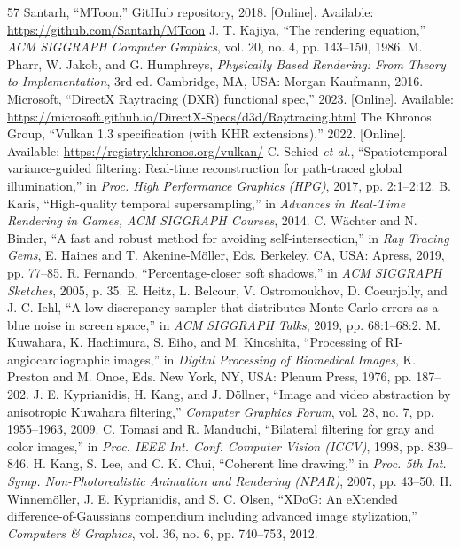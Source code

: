 \documentclass[conference]{IEEEtran}
\begin{document}
\begin{thebibliography}{57}
 Santarh, ``MToon,'' GitHub repository, 2018. [Online]. Available: \url{https://github.com/Santarh/MToon}
 J. T. Kajiya, ``The rendering equation,'' \textit{ACM SIGGRAPH Computer Graphics}, vol. 20, no. 4, pp. 143--150, 1986.
 M. Pharr, W. Jakob, and G. Humphreys, \textit{Physically Based Rendering: From Theory to Implementation}, 3rd ed. Cambridge, MA, USA: Morgan Kaufmann, 2016.
 Microsoft, ``DirectX Raytracing (DXR) functional spec,'' 2023. [Online]. Available: \url{https://microsoft.github.io/DirectX-Specs/d3d/Raytracing.html}
 The Khronos Group, ``Vulkan 1.3 specification (with KHR extensions),'' 2022. [Online]. Available: \url{https://registry.khronos.org/vulkan/}
 C. Schied \textit{et al.}, ``Spatiotemporal variance-guided filtering: Real-time reconstruction for path-traced global illumination,'' in \textit{Proc. High Performance Graphics (HPG)}, 2017, pp. 2:1--2:12.
 B. Karis, ``High-quality temporal supersampling,'' in \textit{Advances in Real-Time Rendering in Games, ACM SIGGRAPH Courses}, 2014.
 C. Wächter and N. Binder, ``A fast and robust method for avoiding self-intersection,'' in \textit{Ray Tracing Gems}, E. Haines and T. Akenine-Möller, Eds. Berkeley, CA, USA: Apress, 2019, pp. 77--85.
 R. Fernando, ``Percentage-closer soft shadows,'' in \textit{ACM SIGGRAPH Sketches}, 2005, p. 35.
 E. Heitz, L. Belcour, V. Ostromoukhov, D. Coeurjolly, and J.-C. Iehl, ``A low-discrepancy sampler that distributes Monte Carlo errors as a blue noise in screen space,'' in \textit{ACM SIGGRAPH Talks}, 2019, pp. 68:1--68:2.
 M. Kuwahara, K. Hachimura, S. Eiho, and M. Kinoshita, ``Processing of RI-angiocardiographic images,'' in \textit{Digital Processing of Biomedical Images}, K. Preston and M. Onoe, Eds. New York, NY, USA: Plenum Press, 1976, pp. 187--202.
 J. E. Kyprianidis, H. Kang, and J. Döllner, ``Image and video abstraction by anisotropic Kuwahara filtering,'' \textit{Computer Graphics Forum}, vol. 28, no. 7, pp. 1955--1963, 2009.
 C. Tomasi and R. Manduchi, ``Bilateral filtering for gray and color images,'' in \textit{Proc. IEEE Int. Conf. Computer Vision (ICCV)}, 1998, pp. 839--846.
 H. Kang, S. Lee, and C. K. Chui, ``Coherent line drawing,'' in \textit{Proc. 5th Int. Symp. Non-Photorealistic Animation and Rendering (NPAR)}, 2007, pp. 43--50.
 H. Winnemöller, J. E. Kyprianidis, and S. C. Olsen, ``XDoG: An eXtended difference-of-Gaussians compendium including advanced image stylization,'' \textit{Computers \& Graphics}, vol. 36, no. 6, pp. 740--753, 2012.

\end{thebibliography}
\end{document}
